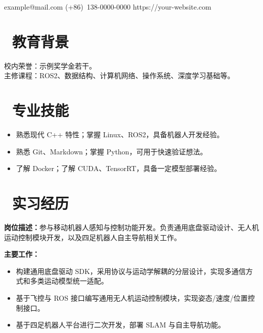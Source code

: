 \documentclass{resume}
\begin{document}

\contactInfo
  {example@mail.com}           %
  {(+86)~138-0000-0000}        %
  {https://your-website.com}   %

\section{\texorpdfstring{\faGraduationCap\ 教育背景}{教育背景}}
校内荣誉：示例奖学金若干。\\
主修课程：ROS2、数据结构、计算机网络、操作系统、深度学习基础等。

\section{\texorpdfstring{\faCogs\ 专业技能}{专业技能}}
\begin{itemize}
  \item 熟悉现代 C++ 特性；掌握 Linux、ROS2，具备机器人开发经验。
  \item 熟悉 Git、Markdown；掌握 Python，可用于快速验证想法。
  \item 了解 Docker；了解 CUDA、TensorRT，具备一定模型部署经验。
\end{itemize}

\section{\texorpdfstring{\faBuildingO\ 实习经历}{实习经历}}
\textbf{岗位描述：}参与移动机器人感知与控制功能开发。负责通用底盘驱动设计、无人机运动控制模块开发，以及四足机器人自主导航相关工作。

\textbf{主要工作：}
\begin{itemize}
  \item 构建通用底盘驱动 SDK，采用协议与运动学解耦的分层设计，实现多通信方式和多类运动模型统一适配。
  \item 基于飞控与 ROS 接口编写通用无人机运动控制模块，实现姿态/速度/位置控制接口。
  \item 基于四足机器人平台进行二次开发，部署 SLAM 与自主导航功能。
\end{itemize}
\end{document}
